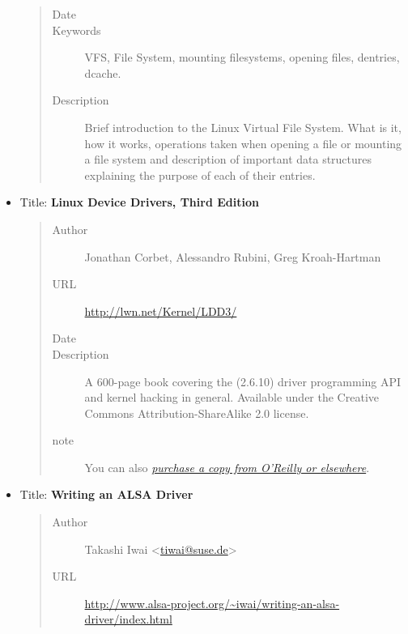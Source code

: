 \documentclass[a4paper,8pt,english]{sphinxmanual}
\begin{document}
\begin{itemize}
\begin{quote}
\begin{description}
\item[{Date}] 

\item[{Keywords}] \leavevmode
VFS, File System, mounting filesystems, opening files,
dentries, dcache.

\item[{Description}] \leavevmode
Brief introduction to the Linux Virtual File System.
What is it, how it works, operations taken when opening a file or
mounting a file system and description of important data
structures explaining the purpose of each of their entries.

\end{description}\end{quote}

\item {} 
Title: \textbf{Linux Device Drivers, Third Edition}
\begin{quote}\begin{description}
\item[{Author}] \leavevmode
Jonathan Corbet, Alessandro Rubini, Greg Kroah-Hartman

\item[{URL}] \leavevmode
\href{http://lwn.net/Kernel/LDD3/}{http://lwn.net/Kernel/LDD3/}

\item[{Date}] 

\item[{Description}] \leavevmode
A 600-page book covering the (2.6.10) driver
programming API and kernel hacking in general.  Available under the
Creative Commons Attribution-ShareAlike 2.0 license.

\item[{note}] \leavevmode
You can also {\hyperref[process/kernel\string-docs:ldd3\string-published]{\emph{purchase a copy from O'Reilly or elsewhere}}}.

\end{description}\end{quote}

\item {} 
Title: \textbf{Writing an ALSA Driver}
\begin{quote}\begin{description}
\item[{Author}] \leavevmode
Takashi Iwai \textless{}\href{mailto:tiwai@suse.de}{tiwai@suse.de}\textgreater{}

\item[{URL}] \leavevmode
\href{http://www.alsa-project.org/~iwai/writing-an-alsa-driver/index.html}{http://www.alsa-project.org/\textasciitilde{}iwai/writing-an-alsa-driver/index.html}


\end{description}
\end{quote}
\end{itemize}
\end{document}
